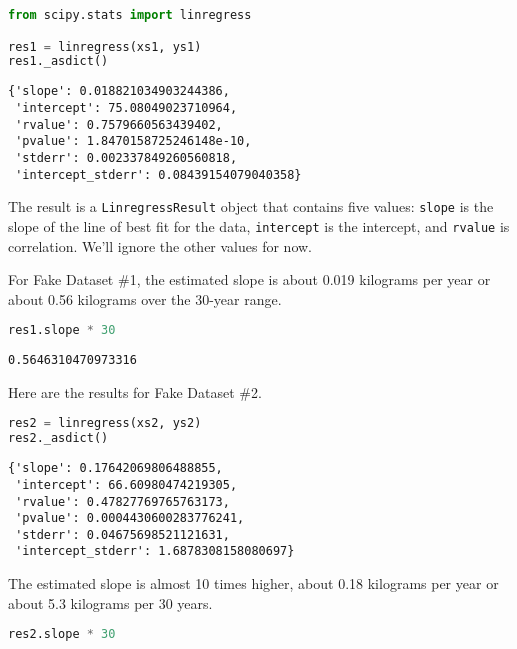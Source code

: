 \begin{lstlisting}[language=Python,style=source]
from scipy.stats import linregress

res1 = linregress(xs1, ys1)
res1._asdict()
\end{lstlisting}

\begin{lstlisting}[style=output]
{'slope': 0.018821034903244386,
 'intercept': 75.08049023710964,
 'rvalue': 0.7579660563439402,
 'pvalue': 1.8470158725246148e-10,
 'stderr': 0.002337849260560818,
 'intercept_stderr': 0.08439154079040358}
\end{lstlisting}

The result is a \passthrough{\lstinline!LinregressResult!} object that
contains five values: \passthrough{\lstinline!slope!} is the slope of
the line of best fit for the data, \passthrough{\lstinline!intercept!}
is the intercept, and \passthrough{\lstinline!rvalue!} is correlation.
We'll ignore the other values for now.

For Fake Dataset \#1, the estimated slope is about 0.019 kilograms per
year or about 0.56 kilograms over the 30-year range.

\begin{lstlisting}[language=Python,style=source]
res1.slope * 30
\end{lstlisting}

\begin{lstlisting}[style=output]
0.5646310470973316
\end{lstlisting}

Here are the results for Fake Dataset \#2.

\begin{lstlisting}[language=Python,style=source]
res2 = linregress(xs2, ys2)
res2._asdict()
\end{lstlisting}

\begin{lstlisting}[style=output]
{'slope': 0.17642069806488855,
 'intercept': 66.60980474219305,
 'rvalue': 0.47827769765763173,
 'pvalue': 0.0004430600283776241,
 'stderr': 0.04675698521121631,
 'intercept_stderr': 1.6878308158080697}
\end{lstlisting}

The estimated slope is almost 10 times higher, about 0.18 kilograms per
year or about 5.3 kilograms per 30 years.

\begin{lstlisting}[language=Python,style=source]
res2.slope * 30
\end{lstlisting}

